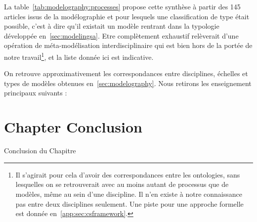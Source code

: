 


La table~\ref{tab:modelography:processes} propose cette synthèse à partir des 145 articles issus de la modélographie et pour lesquels une classification de type était possible, c'est à dire qu'il existait un modèle rentrant dans la typologie développée en~\ref{sec:modelingsa}. Etre complètement exhaustif relèverait d'une opération de méta-modélisation interdisciplinaire qui est bien hors de la portée de notre travail\footnote{Il s'agirait pour cela d'avoir des correspondances entre les ontologies, sans lesquelles on se retrouverait avec au moins autant de processus que de modèles, même au sein d'une discipline. Il n'en existe à notre connaissance pas entre deux disciplines seulement. Une piste pour une approche formelle est donnée en~\ref{app:sec:csframework}.}, et la liste donnée ici est indicative.


On retrouve approximativement les correspondances entre disciplines, échelles et types de modèles obtenues en~\ref{sec:modelography}. Nous retirons les enseignement principaux suivants :







\newpage


\section*{Chapter Conclusion}{Conclusion du Chapitre}

